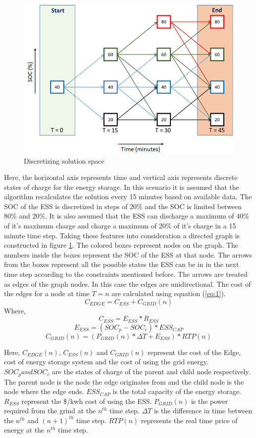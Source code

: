 \begin{figure}[!ht]
    \centering
    \includegraphics[width = \linewidth]{figs/F1_1_Dis.png}
    \caption{Discretizing solution space}
    \label{fig:F1_Dis}
\end{figure}
Here, the horizontal axis represents time and vertical axis represents discrete states of charge for the energy storage. In this scenario it is assumed that the algorithm recalculates the solution every 15 minutes based on available data. The SOC of the ESS is discretized in steps of 20\% and the SOC is limited between 80\% and 20\%. It is also assumed that the ESS can discharge a maximum of 40\% of it's maximum charge and charge a maximum of 20\% of it's charge in a 15 minute time step. Taking these features into consideration a directed graph is constructed in figure \ref{fig:F1_Dis}. The colored boxes represent nodes on the graph. The numbers inside the boxes represent the SOC of the ESS at that node. The arrows from the boxes represent all the possible states the ESS can be in in the next time step according to the constraints mentioned before. The arrows are treated as edges of the graph nodes. In this case the edges are unidirectional. The cost of the edges for a node at time $T = n$ are calculated using equation (\ref{eq:1}).
\begin{equation}
\label{eq:1}
    C_{EDGE} = C_{ESS}+C_{GRID}(n)
\end{equation}
Where,
$$
C_{ESS} = E_{ESS}*R_{ESS} 
$$
$$
E_{ESS} = (SOC_p - SOC_c)*ESS_{CAP}
$$
$$
C_{GRID}(n) = (P_{GRID}(n)*\Delta T + E_{ESS})*RTP(n)
$$

Here, $C_{EDGE}(n)$, $C_{ESS}(n)$ and $C_{GRID}(n)$ represent the cost of the Edge, cost of energy storage system and the cost of using the grid energy. $SOC_p and SOC_c$ are the states of charge of the parent and child node respectively. The parent node is the node the edge originates from and the child node is the node where the edge ends. $ESS_{CAP}$ is the total capacity of the energy storage. $R_{ESS}$ represent the \$/kwh cost of using the ESS. $P_{GRID}(n)$ is the power required from the grind at the $n^{th}$ time step. $\Delta T$ is the difference in time between the $n^{th}$ and $(n+1)^{th}$ time step. $RTP(n)$ represents the real time price of energy at the $n^{th}$ time step. 